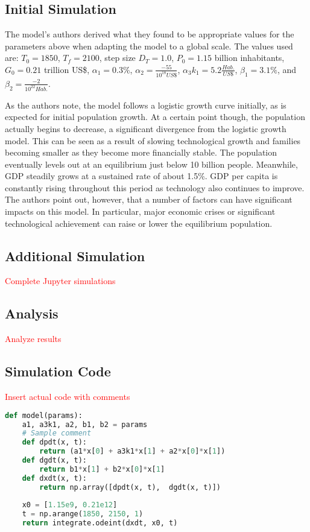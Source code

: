 \documentclass[a4paper]{article}
\newcommand{\todo}[1]{{\Large\textcolor{red}{#1}}}
\begin{document}
\subsection{Initial Simulation}

The model's authors derived what they found to be appropriate values for the parameters above when adapting the model to a global scale. The values used are: $T_0 = 1850$, $T_f = 2100$, step size $D_T = 1.0$, $P_0 = 1.15$ billion inhabitants, $G_0 = 0.21$ trillion US\$, $\alpha_1 = 0.3\%$, $\alpha_2 = \frac{-55}{10^{18} US\$}$, $\alpha_3 k_1 = 5.2 \frac{Hab.}{US \$}$, $\beta_1 = 3.1\%$, and $\beta_2 = \frac{-2}{10^{22} Hab.}$. 

As the authors note, the model follows a logistic growth curve initially, as is expected for initial population growth. At a certain point though, the population actually begins to decrease, a significant divergence from the logistic growth model. This can be seen as a result of slowing technological growth and families becoming smaller as they become more financially stable. The population eventually levels out at an equilibrium just below 10 billion people. Meanwhile, GDP steadily grows at a sustained rate of about 1.5\%. GDP per capita is constantly rising throughout this period as technology also continues to improve. The authors point out, however, that a number of factors can have significant impacts on this model. In particular, major economic crises or significant technological achievement can raise or lower the equilibrium population. 

\subsection{Additional Simulation}

\todo{Complete Jupyter simulations}

\subsection{Analysis}

\todo{Analyze results}

\newpage

\begin{appendices}
\section{Simulation Code}
\todo{Insert actual code with comments}

\begin{lstlisting}[language=Python]
def model(params):   
    a1, a3k1, a2, b1, b2 = params
    # Sample comment
    def dpdt(x, t):
        return (a1*x[0] + a3k1*x[1] + a2*x[0]*x[1])
    def dgdt(x, t):
        return b1*x[1] + b2*x[0]*x[1]
    def dxdt(x, t):
        return np.array([dpdt(x, t),  dgdt(x, t)])
    
    x0 = [1.15e9, 0.21e12]
    t = np.arange(1850, 2150, 1)
    return integrate.odeint(dxdt, x0, t)
\end{lstlisting}

\end{appendices}

\newpage

\nocite{*}


\end{document}
